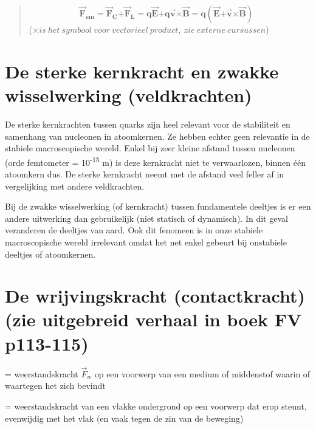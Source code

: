 \documentclass{ximera}
\begin{document}
\begin{quote}
\[{{\overrightarrow{\mathbf{F}}}_{\mathbf{em}}\mathbf{=}{\overrightarrow{\mathbf{F}}}_{\mathbf{C}}\mathbf{+}{\overrightarrow{\mathbf{F}}}_{\mathbf{L}}\mathbf{= q}\overrightarrow{\mathbf{E}}\mathbf{+ q}\overrightarrow{\mathbf{v}}\mathbf{\times}\overrightarrow{\mathbf{B}}\mathbf{= q}\left( \overrightarrow{\mathbf{E}}\mathbf{+}\overrightarrow{\mathbf{v}}\mathbf{\times}\overrightarrow{\mathbf{B}} \right)\mathbf{\ \ \ \ 
}}
\](\(\times is\ het\ symbool\ voor\ vectorieel\ product,\ zie\ externe\ cursussen\))
\end{quote}


\section*{De sterke kernkracht en zwakke wisselwerking (veldkrachten)}

De sterke kernkrachten tussen quarks zijn heel relevant voor de stabiliteit en samenhang van nucleonen in atoomkernen. 
Ze hebben echter geen relevantie in de stabiele macroscopische wereld. 
Enkel bij zeer kleine afstand tussen nucleonen (orde femtometer = 10\textsuperscript{-15} m) is deze kernkracht niet te verwaarlozen, binnen één atoomkern dus. 
De sterke kernkracht neemt met de afstand veel feller af in vergelijking met andere veldkrachten.

Bij de zwakke wisselwerking (of kernkracht) tussen fundamentele deeltjes is er een andere uitwerking dan gebruikelijk (niet statisch of dynamisch). 
In dit geval veranderen de deeltjes van aard. 
Ook dit fenomeen is in onze stabiele macroscopische wereld irrelevant omdat het net enkel gebeurt bij onstabiele deeltjes of atoomkernen.


\section*{De wrijvingskracht (contactkracht) (zie uitgebreid verhaal in boek FV p113-115)}

= weerstandskracht \({\overrightarrow{F}}_{w}\) op een voorwerp van een
medium of middenstof waarin of waartegen het zich bevindt

= weerstandskracht van een vlakke ondergrond op een voorwerp dat erop
steunt, evenwijdig met het vlak (en vaak tegen de zin van de beweging)
\end{document}
